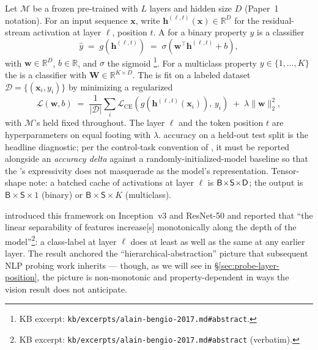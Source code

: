Let $\mathcal{M}$ be a frozen pre-trained  with $L$ layers and
hidden size $D$ (Paper~1 notation). For an input sequence $\mathbf{x}$,
write $\mathbf{h}^{(\ell, t)}(\mathbf{x}) \in \mathbb{R}^D$ for the
residual-stream activation at layer $\ell$, position $t$. A
\emph{} for a binary property $y$ is a classifier
\begin{equation}
  \hat y \;=\; g(\mathbf{h}^{(\ell, t)})
  \;=\; \sigma\!\left(\mathbf{w}^\top \mathbf{h}^{(\ell, t)} + b\right),
  \label{eq:linear-probe}
\end{equation}
with $\mathbf{w} \in \mathbb{R}^D$, $b \in \mathbb{R}$, and $\sigma$ the
sigmoid \citep{alain-bengio-2017}\footnote{KB excerpt:
\texttt{kb/excerpts/alain-bengio-2017.md\#abstract}.}. For a
multiclass property $y \in \{1, \dots, K\}$ the  is a 
classifier with $\mathbf{W} \in \mathbb{R}^{K \times D}$. The  is
fit on a labeled dataset
$\mathcal{D} = \{(\mathbf{x}_i, y_i)\}$ by minimizing a regularized
\begin{equation}
  \mathcal{L}(\mathbf{w}, b)
  \;=\; \frac{1}{|\mathcal{D}|}\sum_{i}\mathcal{L}_{\mathrm{CE}}\!\left(g(\mathbf{h}^{(\ell, t)}(\mathbf{x}_i)),\, y_i\right)
  \;+\; \lambda \|\mathbf{w}\|_2^2,
  \label{eq:probe-loss}
\end{equation}
with $\mathcal{M}$'s  held fixed throughout. The layer $\ell$
and the token position $t$ are hyperparameters on equal footing with
$\lambda$.  accuracy on a held-out test split is the headline
diagnostic; per the control-task convention of
\citet{hewitt2019-control-tasks}, it must be reported alongside an
\emph{accuracy delta} against a randomly-initialized-model baseline so
that the 's expressivity does not masquerade as the model's
representation. Tensor-shape note: a batched cache of activations at
layer $\ell$ is $\mathsf{B}\!\times\!\mathsf{S}\!\times\!\mathsf{D}$; the 
output is $\mathsf{B}\!\times\!\mathsf{S}\!\times\!1$ (binary) or
$\mathsf{B}\!\times\!\mathsf{S}\!\times\!K$ (multiclass).

\citet{alain-bengio-2017} introduced this framework on Inception~v3 and
ResNet-50 and reported that ``the linear separability of features
increase[s] monotonically along the depth of the
model''\footnote{KB excerpt: \texttt{kb/excerpts/alain-bengio-2017.md\#abstract}
(verbatim).}: a class-label  at layer $\ell$ does at least as well
as the same  at any earlier layer. The result anchored the
``hierarchical-abstraction'' picture that subsequent NLP probing work
inherits — though, as we will see in \S\ref{sec:probe-layer-position},
the  picture is non-monotonic and property-dependent in ways the
vision result does not anticipate.

